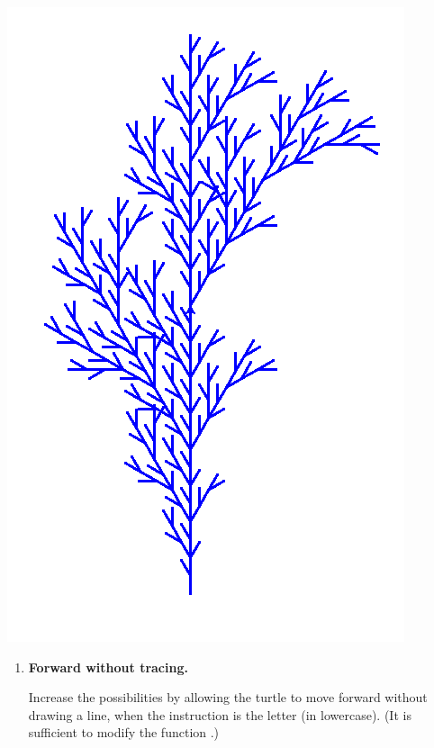 \documentclass[11pt,class=report,crop=false]{standalone}
\begin{document}
\begin{activite}


\begin{center}
\includegraphics[scale=\myscale,scale=0.27]{screen-lsystems-17}
\end{center}

\begin{enumerate}
  \item \textbf{Forward without tracing.} 
  
  Increase the possibilities by allowing the turtle to move forward without drawing a line, when the instruction is the letter  (in lowercase). (It is sufficient to modify the
function .)


\end{enumerate}
\end{activite}
\end{document}
